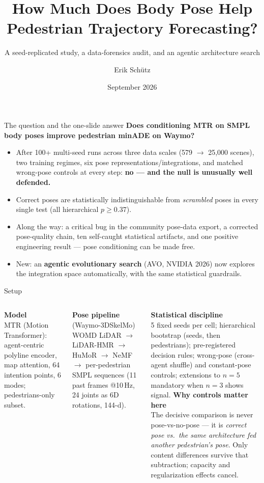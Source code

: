 \documentclass[10pt,aspectratio=169]{beamer}
\title{How Much Does Body Pose Help Pedestrian Trajectory Forecasting?}
\subtitle{A seed-replicated study, a data-forensics audit, and an agentic architecture search}
\author{Erik Schütz}
\date{September 2026}
\newcommand{\ok}[1]{\textcolor{good}{#1}}
\begin{document}
\maketitle

\begin{frame}{The question and the one-slide answer}
\textbf{Does conditioning MTR on SMPL body poses improve pedestrian minADE on Waymo?}
\vspace{0.5em}
\begin{itemize}
  \item After 100+ multi-seed runs across three data scales (579 $\to$ 25{,}000 scenes),
        two training regimes, six pose representations/integrations, and matched
        wrong-pose controls at every step: \textbf{no --- and the null is unusually well defended.}
  \item Correct poses are statistically indistinguishable from \emph{scrambled} poses in
        every single test (all hierarchical $p \geq 0.37$).
  \item Along the way: a critical bug in the community pose-data export, a corrected
        pose-quality chain, ten self-caught statistical artifacts, and one positive
        engineering result --- \ok{pose conditioning can be made free}.
  \item New: an \textbf{agentic evolutionary search} (AVO, NVIDIA 2026) now explores the
        integration space automatically, with the same statistical guardrails.
\end{itemize}
\end{frame}

\begin{frame}{Setup}
\begin{columns}[T]
\textbf{Model} \\ MTR (Motion Transformer): agent-centric polyline encoder, map attention,
64 intention points, 6 modes; pedestrians-only subset.
\vspace{0.6em}

\textbf{Pose pipeline} (Waymo-3DSkelMo) \\ WOMD LiDAR $\to$ LiDAR-HMR $\to$ HuMoR $\to$
NeMF $\to$ per-pedestrian SMPL sequences (11 past frames @10\,Hz, 24 joints as 6D rotations, 144-d).
\vspace{0.6em}

\textbf{Statistical discipline} \\ 5 fixed seeds per cell; hierarchical bootstrap
(seeds, then pedestrians); pre-registered decision rules; wrong-pose (cross-agent shuffle)
and constant-pose controls; extensions to $n{=}5$ mandatory when $n{=}3$ shows signal.
\textbf{Why controls matter here}\\[0.3em]
The decisive comparison is never pose-vs-no-pose --- it is
\emph{correct pose vs.\ the same architecture fed another pedestrian's pose}.
Only content differences survive that subtraction; capacity and
regularization effects cancel.
\end{columns}
\end{frame}
\end{document}
